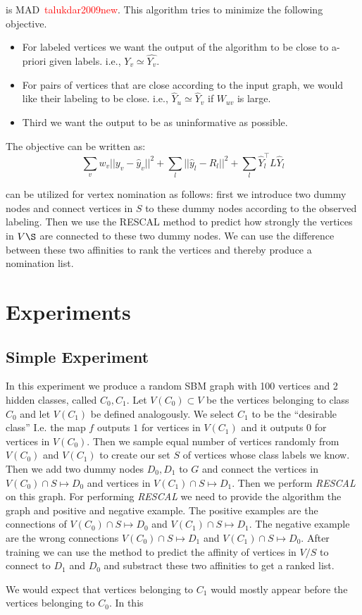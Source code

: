 \documentclass{tufte-handout}
\newcommand{\ie}{i.e.,\xspace}
\renewcommand{\cite}[1]{\textcolor{red}{#1}}
\begin{document}
 is MAD~\cite{talukdar2009new}. 
This algorithm tries to minimize the following objective. 
\begin{itemize}
\item For labeled vertices we want the output of the algorithm to be close to a-priori given labels. \ie{} $Y_v \simeq \hat{Y_v}$.
\item For pairs of vertices that are close according to the input graph, we would like their labeling to be close. \ie{} $\hat{Y}_u \simeq \hat{Y}_v$ if $W_{uv}$ is large. 
\item Third we want the output to be as uninformative as possible.
\end{itemize}
The objective can be written as:
$$ \sum_{v} w_v || y_v - \hat{y}_v ||^2 + \sum_l ||\hat{y}_l - R_l ||^2 + \sum_l \hat{Y}_l^\intercal L \hat{Y}_l $$

 can be utilized for vertex nomination
as follows: first we introduce two dummy nodes and connect vertices in $S$
to these dummy nodes according to the observed labeling. Then we use the RESCAL 
method to predict how strongly the vertices in $V\S$ are connected to these two
dummy nodes. We can use the difference between these two affinities to rank the 
vertices and thereby produce a nomination list. 

\section{Experiments}
\label{sec:experiments}
\subsection{Simple Experiment}
\label{sec:simple-experiment}
In this experiment we produce a random SBM graph with 100 vertices and 
2 hidden classes, called $C_0, C_1$. Let $V(C_0) \subset V$ 
be the vertices belonging to class $C_0$ and let $V(C_1)$ be defined 
analogously. We select $C_1$ to be the ``desirable class'' 
I.e. the map $f$ outputs $1$ for vertices in $V(C_1)$
and it outputs $0$ for vertices in $V(C_0)$.
Then we sample equal number of vertices randomly from $V(C_0)$ and $V(C_1)$
to create our set $S$ of vertices whose class labels we know. 
Then we add two dummy nodes $D_0, D_1$ to $G$ and connect 
the vertices in $V(C_0) \cap S \mapsto D_0$ and 
vertices in $V(C_1) \cap S \mapsto D_1$. 
Then we perform \textit{RESCAL} on this graph.
For performing \textit{RESCAL} we need to provide the algorithm
the graph and positive and negative example. 
The positive examples are the connections of $V(C_0) \cap S \mapsto D_0$
and $V(C_1) \cap S \mapsto D_1$. The negative example are the 
wrong connections $V(C_0) \cap S \mapsto D_1$ and $V(C_1) \cap S \mapsto D_0$.
After training we can use the method to predict the affinity of vertices 
in $V/S$ to connect to $D_1$ and $D_0$ and substract these two affinities 
to get a ranked list.

We would expect that vertices belonging to $C_1$ would mostly appear before the 
vertices belonging to $C_0$. In this 



\end{document}
